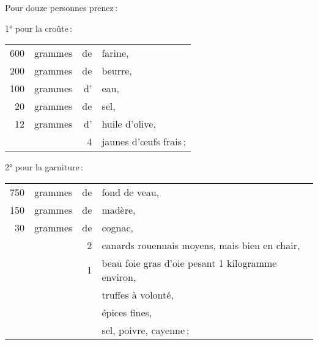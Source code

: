 Pour douze personnes prenez :

\medskip

1° pour la croûte :

\medskip

\footnotesize
\begin{longtable}{rrrp{16em}}
    600 & grammes & de & farine,                                                                          \\
    200 & grammes & de & beurre,                                                                          \\
    100 & grammes & d' & eau,                                                                             \\
     20 & grammes & de & sel,                                                                             \\
     12 & grammes & d' & huile d'olive,                                                                   \\
        &         &  4 & jaunes d'œufs frais ;                                                            \\
\end{longtable}
\normalsize

2° pour la garniture :

\medskip

\footnotesize
\begin{longtable}{rrrp{16em}}
    750 & grammes & de & fond de veau,                                                                    \\
    150 & grammes & de & madère,                                                                          \\
     30 & grammes & de & cognac,                                                                          \\
        &         &  2 & canards rouennais moyens, mais bien en chair,                                    \\
        &         &  1 & beau foie gras d'oie pesant 1 kilogramme environ,                                \\
        &         &    & truffes à volonté,                                                               \\
        &         &    & épices fines,                                                                    \\
        &         &    & sel, poivre, cayenne ;                                                           \\
\end{longtable}
\normalsize

